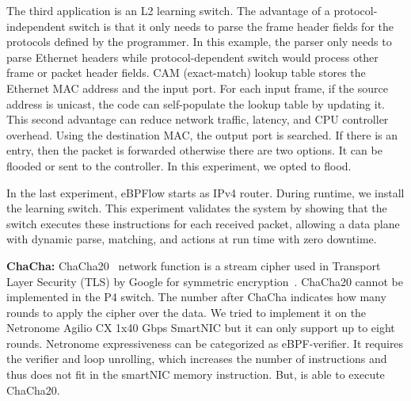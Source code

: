 
The third application is an L2 learning switch. The advantage of a protocol-independent switch is that it only needs to parse the frame header fields for the protocols defined by the programmer. In this example, the parser only needs to parse Ethernet headers while protocol-dependent switch would process other frame or packet header fields. CAM (exact-match) lookup table stores the Ethernet MAC address and the input port. 
For each input frame, if the source address is unicast, the code can self-populate the lookup table by updating it. This second advantage can reduce network traffic, latency, and CPU controller overhead. Using the destination MAC, the output port is searched. If there is an entry, then the packet is forwarded otherwise there are two options. It can be flooded or sent to the controller. In this experiment, we opted to flood.


In the last experiment, eBPFlow starts as IPv4 router. During runtime, we install the learning switch. This experiment validates the system by showing that the switch executes these instructions for each received packet, allowing a data plane with dynamic parse, matching, and actions at run time with zero downtime.

\textbf{ChaCha:} 
ChaCha20~\cite{rfc8439} network function is a
stream cipher used in Transport Layer Security (TLS) by Google for symmetric
encryption~\cite{google-chacha}.
ChaCha20 cannot be implemented in the P4 switch.
The number after ChaCha indicates how many rounds to apply the cipher over the data.
We tried to implement it on the Netronome Agilio CX 1x40 Gbps SmartNIC but it can only support up to eight rounds. Netronome expressiveness can be categorized as eBPF-verifier. It requires the verifier and loop unrolling, which increases the number of instructions and thus does not fit in the smartNIC memory instruction.
But, \system is able to execute ChaCha20.


